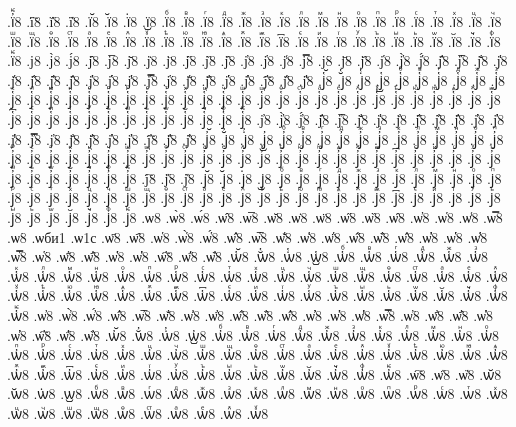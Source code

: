 {.ї҆ꚟ8
.ї҇8
.ї᷀8
.ї᷁8
.ї᷶8
.ї᷷8
.ї᷸8
.ї᷹8
.їⷠ8
.їⷡ8
.їⷢ8
.їⷣ8
.їⷤ8
.їⷥ8
.їⷦ8
.їⷧ8
.їⷨ8
.їⷩ8
.їⷪ8
.їⷫ8
.їⷬ8
.їⷭ8
.їⷮ8
.їⷯ8
.їⷰ8
.їⷱ8
.їⷲ8
.їⷳ8
.їⷴ8
.їⷵ8
.їⷶ8
.їⷷ8
.їⷸ8
.їⷹ8
.їⷺ8
.їⷻ8
.їⷼ8
.їⷽ8
.їⷾ8
.їⷿ8
.ї꙯8
.їꙴ8
.їꙵ8
.їꙶ8
.їꙷ8
.їꙸ8
.їꙹ8
.їꙺ8
.їꙻ8
.ї꙼8
.ї꙽8
.їꚞ8
.їꚟ8
.ј8
.ј̀8
.ј́8
.ј̂8
.ј̅8
.ј̆8
.ј̇8
.ј̈8
.ј̋8
.ј̏8
.ј̑8
.ј̓8
.ј̔8
.ј̾8
.ј̿8
.ј͘8
.ј҃8
.ј҄8
.ј҅8
.ј҅̀8
.ј҅́8
.ј҅̂8
.ј҅̅8
.ј҅̆8
.ј҅̇8
.ј҅̈8
.ј҅̋8
.ј҅̏8
.ј҅̑8
.ј҅̓8
.ј҅̔8
.ј҅̾8
.ј҅̿8
.ј҅͘8
.ј҅҃8
.ј҅҄8
.ј҅҅8
.ј҅҆8
.ј҅҇8
.ј҅᷀8
.ј҅᷁8
.ј҅᷶8
.ј᷷҅8
.ј᷸҅8
.ј᷹҅8
.ј҅ⷠ8
.ј҅ⷡ8
.ј҅ⷢ8
.ј҅ⷣ8
.ј҅ⷤ8
.ј҅ⷥ8
.ј҅ⷦ8
.ј҅ⷧ8
.ј҅ⷨ8
.ј҅ⷩ8
.ј҅ⷪ8
.ј҅ⷫ8
.ј҅ⷬ8
.ј҅ⷭ8
.ј҅ⷮ8
.ј҅ⷯ8
.ј҅ⷰ8
.ј҅ⷱ8
.ј҅ⷲ8
.ј҅ⷳ8
.ј҅ⷴ8
.ј҅ⷵ8
.ј҅ⷶ8
.ј҅ⷷ8
.ј҅ⷸ8
.ј҅ⷹ8
.ј҅ⷺ8
.ј҅ⷻ8
.ј҅ⷼ8
.ј҅ⷽ8
.ј҅ⷾ8
.ј҅ⷿ8
.ј҅꙯8
.ј҅ꙴ8
.ј҅ꙵ8
.ј҅ꙶ8
.ј҅ꙷ8
.ј҅ꙸ8
.ј҅ꙹ8
.ј҅ꙺ8
.ј҅ꙻ8
.ј҅꙼8
.ј҅꙽8
.ј҅ꚞ8
.ј҅ꚟ8
.ј҆8
.ј҆̀8
.ј҆́8
.ј҆̂8
.ј҆̅8
.ј҆̆8
.ј҆̇8
.ј҆̈8
.ј҆̋8
.ј҆̏8
.ј҆̑8
.ј҆̓8
.ј҆̔8
.ј҆̾8
.ј҆̿8
.ј҆͘8
.ј҆҃8
.ј҆҄8
.ј҆҅8
.ј҆҆8
.ј҆҇8
.ј҆᷀8
.ј҆᷁8
.ј҆᷶8
.ј᷷҆8
.ј᷸҆8
.ј᷹҆8
.ј҆ⷠ8
.ј҆ⷡ8
.ј҆ⷢ8
.ј҆ⷣ8
.ј҆ⷤ8
.ј҆ⷥ8
.ј҆ⷦ8
.ј҆ⷧ8
.ј҆ⷨ8
.ј҆ⷩ8
.ј҆ⷪ8
.ј҆ⷫ8
.ј҆ⷬ8
.ј҆ⷭ8
.ј҆ⷮ8
.ј҆ⷯ8
.ј҆ⷰ8
.ј҆ⷱ8
.ј҆ⷲ8
.ј҆ⷳ8
.ј҆ⷴ8
.ј҆ⷵ8
.ј҆ⷶ8
.ј҆ⷷ8
.ј҆ⷸ8
.ј҆ⷹ8
.ј҆ⷺ8
.ј҆ⷻ8
.ј҆ⷼ8
.ј҆ⷽ8
.ј҆ⷾ8
.ј҆ⷿ8
.ј҆꙯8
.ј҆ꙴ8
.ј҆ꙵ8
.ј҆ꙶ8
.ј҆ꙷ8
.ј҆ꙸ8
.ј҆ꙹ8
.ј҆ꙺ8
.ј҆ꙻ8
.ј҆꙼8
.ј҆꙽8
.ј҆ꚞ8
.ј҆ꚟ8
.ј҇8
.ј᷀8
.ј᷁8
.ј᷶8
.ј᷷8
.ј᷸8
.ј᷹8
.јⷠ8
.јⷡ8
.јⷢ8
.јⷣ8
.јⷤ8
.јⷥ8
.јⷦ8
.јⷧ8
.јⷨ8
.јⷩ8
.јⷪ8
.јⷫ8
.јⷬ8
.јⷭ8
.јⷮ8
.јⷯ8
.јⷰ8
.јⷱ8
.јⷲ8
.јⷳ8
.јⷴ8
.јⷵ8
.јⷶ8
.јⷷ8
.јⷸ8
.јⷹ8
.јⷺ8
.јⷻ8
.јⷼ8
.јⷽ8
.јⷾ8
.јⷿ8
.ј꙯8
.јꙴ8
.јꙵ8
.јꙶ8
.јꙷ8
.јꙸ8
.јꙹ8
.јꙺ8
.јꙻ8
.ј꙼8
.ј꙽8
.јꚞ8
.јꚟ8
.ѡ8
.ѡ̀8
.ѡ́8
.ѡ̂8
.ѡ̅8
.ѡ̆8
.ѡ̇8
.ѡ̈8
.ѡ̋8
.ѡ̏8
.ѡ̑8
.ѡ̓8
.ѡ̔8
.ѡ̾8
.ѡ̿8
.ѡ͘8
.ѡби1
.ѡ1с
.ѡ҃8
.ѡ҄8
.ѡ҅8
.ѡ҅̀8
.ѡ҅́8
.ѡ҅̂8
.ѡ҅̅8
.ѡ҅̆8
.ѡ҅̇8
.ѡ҅̈8
.ѡ҅̋8
.ѡ҅̏8
.ѡ҅̑8
.ѡ҅̓8
.ѡ҅̔8
.ѡ҅̾8
.ѡ҅̿8
.ѡ҅͘8
.ѡ҅҃8
.ѡ҅҄8
.ѡ҅҅8
.ѡ҅҆8
.ѡ҅҇8
.ѡ҅᷀8
.ѡ҅᷁8
.ѡ҅᷶8
.ѡ᷷҅8
.ѡ᷸҅8
.ѡ᷹҅8
.ѡ҅ⷠ8
.ѡ҅ⷡ8
.ѡ҅ⷢ8
.ѡ҅ⷣ8
.ѡ҅ⷤ8
.ѡ҅ⷥ8
.ѡ҅ⷦ8
.ѡ҅ⷧ8
.ѡ҅ⷨ8
.ѡ҅ⷩ8
.ѡ҅ⷪ8
.ѡ҅ⷫ8
.ѡ҅ⷬ8
.ѡ҅ⷭ8
.ѡ҅ⷮ8
.ѡ҅ⷯ8
.ѡ҅ⷰ8
.ѡ҅ⷱ8
.ѡ҅ⷲ8
.ѡ҅ⷳ8
.ѡ҅ⷴ8
.ѡ҅ⷵ8
.ѡ҅ⷶ8
.ѡ҅ⷷ8
.ѡ҅ⷸ8
.ѡ҅ⷹ8
.ѡ҅ⷺ8
.ѡ҅ⷻ8
.ѡ҅ⷼ8
.ѡ҅ⷽ8
.ѡ҅ⷾ8
.ѡ҅ⷿ8
.ѡ҅꙯8
.ѡ҅ꙴ8
.ѡ҅ꙵ8
.ѡ҅ꙶ8
.ѡ҅ꙷ8
.ѡ҅ꙸ8
.ѡ҅ꙹ8
.ѡ҅ꙺ8
.ѡ҅ꙻ8
.ѡ҅꙼8
.ѡ҅꙽8
.ѡ҅ꚞ8
.ѡ҅ꚟ8
.ѡ҆8
.ѡ҆̀8
.ѡ҆́8
.ѡ҆̂8
.ѡ҆̅8
.ѡ҆̆8
.ѡ҆̇8
.ѡ҆̈8
.ѡ҆̋8
.ѡ҆̏8
.ѡ҆̑8
.ѡ҆̓8
.ѡ҆̔8
.ѡ҆̾8
.ѡ҆̿8
.ѡ҆͘8
.ѡ҆҃8
.ѡ҆҄8
.ѡ҆҅8
.ѡ҆҆8
.ѡ҆҇8
.ѡ҆᷀8
.ѡ҆᷁8
.ѡ҆᷶8
.ѡ᷷҆8
.ѡ᷸҆8
.ѡ᷹҆8
.ѡ҆ⷠ8
.ѡ҆ⷡ8
.ѡ҆ⷢ8
.ѡ҆ⷣ8
.ѡ҆ⷤ8
.ѡ҆ⷥ8
.ѡ҆ⷦ8
.ѡ҆ⷧ8
.ѡ҆ⷨ8
.ѡ҆ⷩ8
.ѡ҆ⷪ8
.ѡ҆ⷫ8
.ѡ҆ⷬ8
.ѡ҆ⷭ8
.ѡ҆ⷮ8
.ѡ҆ⷯ8
.ѡ҆ⷰ8
.ѡ҆ⷱ8
.ѡ҆ⷲ8
.ѡ҆ⷳ8
.ѡ҆ⷴ8
.ѡ҆ⷵ8
.ѡ҆ⷶ8
.ѡ҆ⷷ8
.ѡ҆ⷸ8
.ѡ҆ⷹ8
.ѡ҆ⷺ8
.ѡ҆ⷻ8
.ѡ҆ⷼ8
.ѡ҆ⷽ8
.ѡ҆ⷾ8
.ѡ҆ⷿ8
.ѡ҆꙯8
.ѡ҆ꙴ8
.ѡ҆ꙵ8
.ѡ҆ꙶ8
.ѡ҆ꙷ8
.ѡ҆ꙸ8
.ѡ҆ꙹ8
.ѡ҆ꙺ8
.ѡ҆ꙻ8
.ѡ҆꙼8
.ѡ҆꙽8
.ѡ҆ꚞ8
.ѡ҆ꚟ8
.ѡ҇8
.ѡ᷀8
.ѡ᷁8
.ѡ᷶8
.ѡ᷷8
.ѡ᷸8
.ѡ᷹8
.ѡⷠ8
.ѡⷡ8
.ѡⷢ8
.ѡⷣ8
.ѡⷤ8
.ѡⷥ8
.ѡⷦ8
.ѡⷧ8
.ѡⷨ8
.ѡⷩ8
.ѡⷪ8
.ѡⷫ8
.ѡⷬ8
.ѡⷭ8
.ѡⷮ8
.ѡⷯ8
.ѡⷰ8
.ѡⷱ8
.ѡⷲ8
.ѡⷳ8
.ѡⷴ8
.ѡⷵ8
.ѡⷶ8
.ѡⷷ8
.ѡⷸ8
.ѡⷹ8
}
